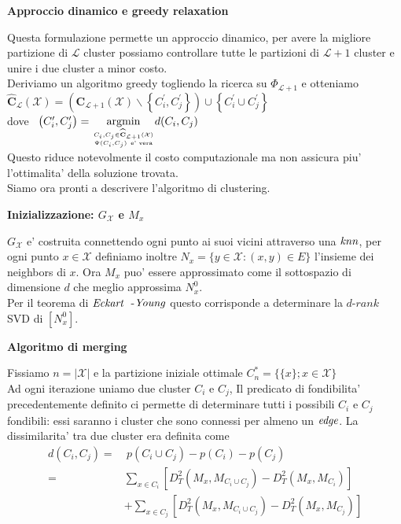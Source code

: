 \documentclass[a4, landscape]{seminar}
\theoremstyle{definition}
\def\bc{\begin{center}}
\def\ec{\end{center}}
\def\bs{\begin{slide}\begingroup\small}
\def\es{\endgroup\end{slide}}
\begin{document}
\bs
\bc{\bf\color{blue}Approccio dinamico e greedy relaxation}\ec
Questa formulazione permette un approccio dinamico, per avere la migliore partizione di $\mathcal{L}$ cluster possiamo controllare tutte le partizioni di $\mathcal{L} + 1$ cluster e unire i due cluster a minor costo. \\
Deriviamo un algoritmo greedy togliendo la ricerca su $\Phi_{\mathcal{L}+1}$ e otteniamo
\vskip 0.05in
$\widehat{\mathbf{C}}_{\mathcal{L}}(\mathcal{X})=\left(\mathbf{C}_{\mathcal{L}+1}(\mathcal{X}) \backslash\left\{C_{i}^{\prime}, C_{j}^{\prime}\right\}\right) \cup\left\{C_{i}^{\prime} \cup C_{j}^{\prime}\right\}$ \\
dove \ $\left(C_{i}^{\prime}, C_{j}^{\prime}\right)=\underset{C_{i}, C_{j} \in \widehat{\mathbf{C}}_{\mathcal{L} + 1}(\mathcal{X}) \atop \Psi(C_i, C_j) \ \text{e' vera}}{\operatorname{argmin}}d(C_{i}, C_{j})$ \\
Questo riduce notevolmente il costo computazionale ma non assicura piu' l'ottimalita' della soluzione trovata. \\
\vskip 0.1in
Siamo ora pronti a descrivere l'algoritmo di clustering.
\es

\bs
\bc{\bf\color{blue}Inizializzazione: $G_\mathcal{X}$ e $M_x$}\ec
$G_\mathcal{X}$ e' costruita connettendo ogni punto ai suoi vicini attraverso una $\it{knn}$, per ogni punto $x\in\mathcal{X}$
definiamo inoltre $N_x = \{y\in\mathcal{X} : \left( x, y \right) \in E \}$ l'insieme dei neighbors di $x$.
Ora $M_x$ puo' essere approssimato come il sottospazio di dimensione $d$ che meglio approssima $N^{0}_x$. \\
Per il teorema di $\it{Eckart}$\ -$\it{Young}$ questo corrisponde a determinare la $d$-$rank$ SVD di $\left[N^{0}_x\right]$.
\bc{\bf\color{blue}Algoritmo di merging}\ec
Fissiamo $n=|\mathcal{X}|$ e la partizione iniziale ottimale $C^{*}_n = \{\{x\}; x\in\mathcal{X}\}$ \\
Ad ogni iterazione uniamo due cluster $C_i$ e $C_j$, Il predicato di fondibilita' precedentemente definito ci permette
di determinare tutti i possibili $C_i$ e $C_j$ fondibili: essi saranno i cluster che sono connessi per almeno un $\it{edge}$.
La dissimilarita' tra due cluster era definita come
\begin{equation*}
\begin{aligned}
d(C_i, C_j) =& \ p(C_i\cup C_j) - p(C_i) - p(C_j) \\
=& \sum_{x \in C_{i}} \left[D_{T}^{2}\left(M_{x}, M_{C_{i} \cup C_{j}}\right)- D_{T}^{2}\left(M_{x}, M_{C_{i}}\right)\right] \\
&+\sum_{x \in C_{j}} \left[D_{T}^{2}\left(M_{x}, M_{C_{i} \cup C_{j}}\right)-D_{T}^{2}\left(M_{x}, M_{C_{j}}\right)\right]
\end{aligned}
\end{equation*}
\es
\end{document}
